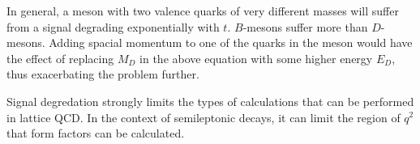 In general, a meson with two valence quarks of very different masses will suffer from a signal degrading exponentially with $t$. $B$-mesons suffer more than $D$-mesons. Adding spacial momentum to one of the quarks in the meson would have the effect of replacing $M_D$ in the above equation with some higher energy $E_D$, thus exacerbating the problem further.

Signal degredation strongly limits the types of calculations that can be performed in lattice QCD. In the context of semileptonic decays, it can limit the region of $q^2$ that form factors can be calculated.




